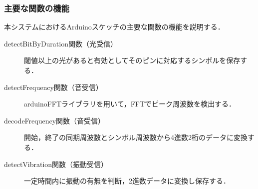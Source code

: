 \subsubsection{主要な関数の機能}
本システムにおけるArduinoスケッチの主要な関数の機能を説明する．

\begin{description}
    \item[detectBitByDuration関数（光受信）]
    閾値以上の光があると有効としてそのピンに対応するシンボルを保存する．
    \item[detectFrequency関数（音受信）]
    arduinoFFTライブラリを用いて，FFTでピーク周波数を検出する．
    \item[decodeFrequency関数（音受信）]
    開始，終了の同期周波数とシンボル周波数から4進数2桁のデータに変換する．
    \item[detectVibration関数（振動受信）]
    一定時間内に振動の有無を判断，2進数データに変換し保存する．
\end{description}

\clearpage